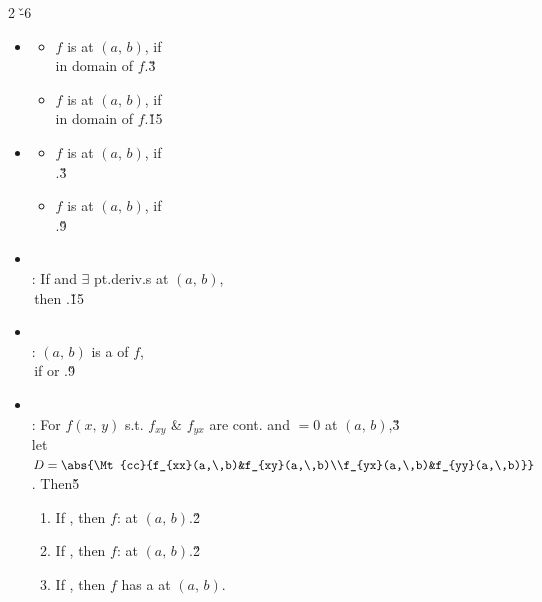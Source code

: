 \documentclass[dvipdfmx,a4paper,titlepage,9pt]{jsarticle}
\begin{document}
\begin{multicols*}{2}
\v{-6}
\begin{itemize}[label={-}]
\item{}
\begin{itemize}[label=\Cdot]
\setlength{\leftskip}{-10pt}
\item $f$ is  at $(a,\,b)$, if\\
 in domain of $f$.\v3
\item $f$ is  at $(a,\,b)$, if\\
 in domain of $f$.\v{15}
\end{itemize}
\item{}
\begin{itemize}[label=\Cdot]
\setlength{\leftskip}{-10pt}
\item $f$ is  at $(a,\,b)$, if\\
.\v3
\item $f$ is  at $(a,\,b)$, if\\
.\v9
\end{itemize}
\item{}\\
: If  and $\exists$ pt.deriv.s at $(a,\,b)$,\\
\;\;\,then .\v{15}
\item{}\\
: $(a,\,b)$ is a  of $f$,\\
\;\;\,if  or .\v9
\item{}\\
: For $f(x,\,y)$ s.t. $f_{xy}$ \& $f_{yx}$ are cont. and $=0$ at $(a,\,b)$,\v3\\
\;\;let $D=\abs{\Mt{cc}{f_{xx}(a,\,b)&f_{xy}(a,\,b)\\f_{yx}(a,\,b)&f_{yy}(a,\,b)}}$. Then\v5
\begin{enumerate}[label=(\roman*)]
\setlength{\leftskip}{3pt}
\item If , then $f$:  at $(a,\,b)$.\v2
\item If , then $f$:  at $(a,\,b)$.\v2
\item If , then $f$ has a  at $(a,\,b)$.
\end{enumerate}


\end{itemize}
\end{multicols*}
\end{document}
